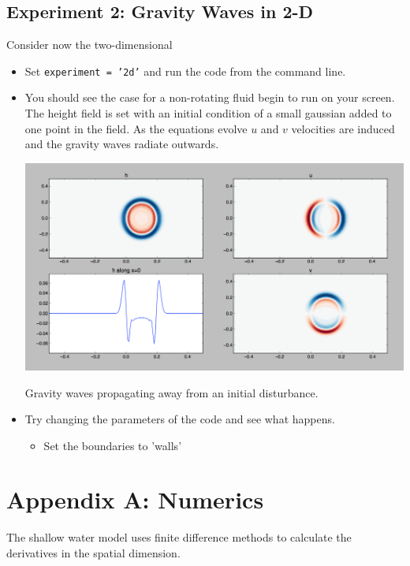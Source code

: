 \documentclass[a4paper, sfsidenotes, twoside]{tufte-handout}
\begin{document}
  \subsection{Experiment 2: Gravity Waves in 2-D}
  \label{sub:exp2}
  Consider now the two-dimensional
    \begin{itemize}
    \item Set \texttt{experiment = '2d'} and run the code from the command line.

    \item You should see the case for a non-rotating fluid begin to run on
    your screen.  The height field is set with an initial condition of a small
    gaussian added to one point in the field.  As the equations evolve $u$ and
    $v$ velocities are induced and the gravity waves radiate outwards.
    \begin{marginfigure}
      \includegraphics{gravity_waves}
      \caption{Gravity waves propagating away from an initial disturbance.}
      \label{fig:gravwaves}
    \end{marginfigure}
    \item Try changing the parameters of the code and see what happens.
    \begin{itemize}
      \item Set the boundaries to 'walls'
    \end{itemize}
  \end{itemize}

  \section{Appendix A: Numerics}
  \label{sec:appendixa}

  \noindent The shallow water model uses finite difference methods to calculate
  the derivatives in the spatial dimension.
\end{document}
